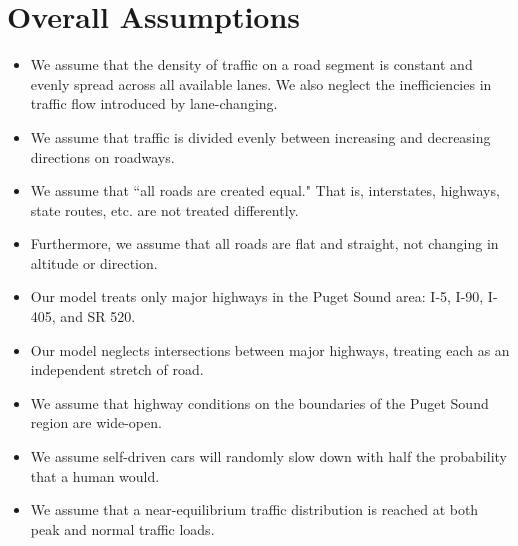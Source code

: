 \section{Overall Assumptions} \label{sec:assumptions}
\begin{itemize}
\item We assume that the density of traffic on a road segment is constant and evenly spread across all available lanes. We also neglect the inefficiencies in traffic flow introduced by lane-changing.
\item We assume that traffic is divided evenly between increasing and decreasing directions on roadways.
\item We assume that ``all roads are created equal." That is, interstates, highways, state routes, etc. are not treated differently.
\item Furthermore, we assume that all roads are flat and straight, not changing in altitude or direction.
\item Our model treats only major highways in the Puget Sound area: I-5, I-90, I-405, and SR 520.
\item Our model neglects intersections between major highways, treating each as an independent stretch of road.
\item We assume that highway conditions on the boundaries of the Puget Sound region are wide-open.
\item We assume self-driven cars will randomly slow down with half the probability that a human would.
\item We assume that a near-equilibrium traffic distribution is reached at both peak and normal traffic loads.
\end{itemize}